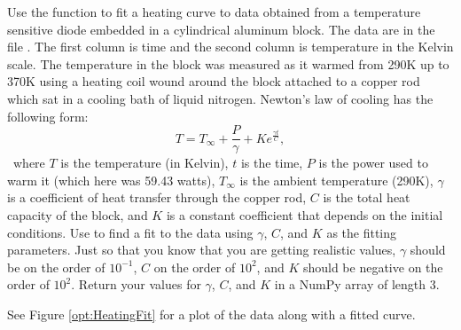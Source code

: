 \begin{problem}
Use the  function to fit a heating curve to data obtained from a temperature sensitive diode embedded in a cylindrical aluminum block.
The data are in the file . The first column is time and the second column is temperature in the Kelvin scale.
The temperature in the block was measured as it warmed from 290K up to 370K using a heating coil wound around the block attached to a
copper rod which sat in a cooling bath of liquid nitrogen.
Newton's law of cooling has the following form:
\[
T = T_{\infty} + \frac{P}{\gamma}+Ke^{\frac{\gamma t}{C}},
\]\
where $T$ is the temperature (in Kelvin), $t$ is the time, $P$ is the power used to warm it (which here was 59.43 watts),
$T_{\infty}$ is the ambient temperature (290K), $\gamma$ is a coefficient of heat transfer through the copper rod,
$C$ is the total heat capacity of the block, and $K$ is a constant coefficient that depends on the initial conditions.
Use \li{opt.curve_fit} to find a fit to the data using $\gamma$, $C$, and $K$ as the fitting parameters.
Just so that you know that you are getting realistic values, $\gamma$ should be on the order of $10^{-1}$, $C$ on the order of $10^{2}$, and $K$ should be negative on the order of $10^{2}$.
Return your values for $\gamma$, $C$, and $K$ in a NumPy array of length 3.

See Figure \ref{opt:HeatingFit} for a plot of the data along with a fitted curve.

\end{problem}

